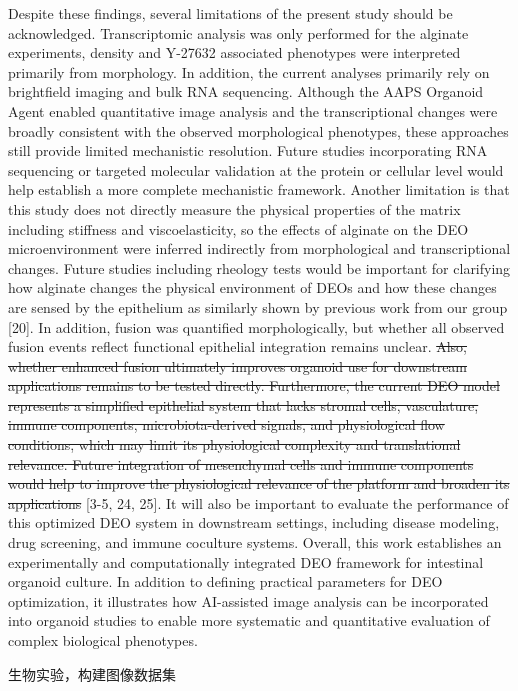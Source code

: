 \documentclass[
]{article}
\begin{document}
Despite these findings, several limitations of the present study should be acknowledged. Transcriptomic analysis was only performed for the alginate experiments, density and Y-27632 associated phenotypes were interpreted primarily from morphology. In addition, the current analyses primarily rely on brightfield imaging and bulk RNA sequencing. Although the AAPS Organoid Agent enabled quantitative image analysis and the transcriptional changes were broadly consistent with the observed morphological phenotypes, these approaches still provide limited mechanistic resolution. Future studies incorporating RNA sequencing or targeted molecular validation at the protein or cellular level would help establish a more complete mechanistic framework. Another limitation is that this study does not directly measure the physical properties of the matrix including stiffness and viscoelasticity, so the effects of alginate on the DEO microenvironment were inferred indirectly from morphological and transcriptional changes. Future studies including rheology tests would be important for clarifying how alginate changes the physical environment of DEOs and how these changes are sensed by the epithelium as similarly shown by previous work from our group {[}20{]}. In addition, fusion was quantified morphologically, but whether all observed fusion events reflect functional epithelial integration remains unclear. \sout{Also, whether enhanced fusion ultimately improves organoid use for downstream applications remains to be tested directly. Furthermore, the current DEO model represents a simplified epithelial system that lacks stromal cells, vasculature, immune components, microbiota-derived signals, and physiological flow conditions, which may limit its physiological complexity and translational relevance. Future integration of mesenchymal cells and immune components would help to improve the physiological relevance of the platform and broaden its applications} {[}3-5, 24, 25{]}. It will also be important to evaluate the performance of this optimized DEO system in downstream settings, including disease modeling, drug screening, and immune coculture systems. Overall, this work establishes an experimentally and computationally integrated DEO framework for intestinal organoid culture. In addition to defining practical parameters for DEO optimization, it illustrates how AI-assisted image analysis can be incorporated into organoid studies to enable more systematic and quantitative evaluation of complex biological phenotypes.

生物实验，构建图像数据集
\end{document}
